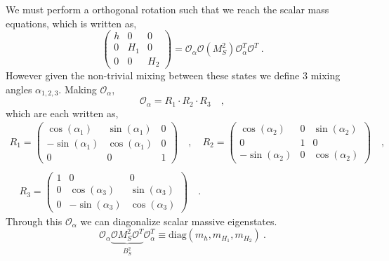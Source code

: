 \documentclass[10pt]{book}
\renewcommand{\(}{\left(}
\renewcommand{\)}{\right)}
\renewcommand{\[}{\left[}
\renewcommand{\]}{\right]}
\begin{document}
%
We must perform a orthogonal rotation such that we reach the scalar mass equations, which is written as, 
\begin{equation}
\left( 
\begin{array}{ccc}
h & 0 & 0  \\
0 & H_1 & 0 \\
0 & 0 & H_2 
\end{array} 
\right) = \mathcal{O}_\alpha \mathcal{O} \left(M_S^2\right) \mathcal{O}_\alpha^T \mathcal{O}^T \ .
\end{equation} 
However given the non-trivial mixing between these states we define 3 mixing angles $\alpha_{1,2,3}$. Making $\mathcal{O}_\alpha$, 
\begin{equation}
\mathcal{O}_\alpha = R_1 \cdot R_2 \cdot R_3 \quad , 
\end{equation}
which are each written as,
\begin{gather}
R_1 = \begin{pmatrix}
\cos(\alpha_1) & \sin(\alpha_1) & 0 \\
-\sin(\alpha_1) & \cos(\alpha_1) & 0 \\ 
0 & 0 & 1 
\end{pmatrix} \quad , \quad R_2 = \begin{pmatrix}
\cos(\alpha_2) & 0 & \sin(\alpha_2) \\ 
0 & 1 & 0 \\
-\sin(\alpha_2) & 0 & \cos(\alpha_2) 
\end{pmatrix} \quad ,\\ \\ \quad R_3 = \begin{pmatrix}
1 & 0 & 0 \\
0 & \cos(\alpha_3 ) & \sin(\alpha_3) \\
0 & -\sin(\alpha_3) & \cos(\alpha_3) 
\end{pmatrix} \quad . 
\end{gather}
Through this $\mathcal{O}_\alpha$ we can diagonalize scalar massive eigenstates. 
\begin{equation}
\mathcal{O}_\alpha \underbrace{\mathcal{O} M^2_S \mathcal{O}^T }_{B_S^2} \mathcal{O}_\alpha^T \equiv \text{diag}(m_h,m_{H_1},m_{H_2}) \ . 
\end{equation}
\end{document}
